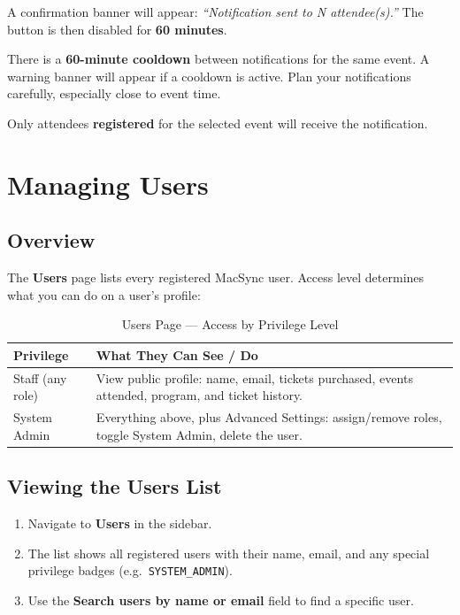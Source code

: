 \documentclass[12pt, twoside]{report}
\newcommand{\uielem}[1]{\textbf{#1}}
\begin{document}
A confirmation banner will appear: \textit{``Notification sent to N
attendee(s).''} The button is then disabled for \textbf{60 minutes}.

\begin{warnbox}
There is a \textbf{60-minute cooldown} between notifications for the same
event. A warning banner will appear if a cooldown is active. Plan your
notifications carefully, especially close to event time.
\end{warnbox}

\begin{tipbox}
Only attendees \textbf{registered} for the selected event will receive
the notification.
\end{tipbox}



\chapter{Managing Users}


\section{Overview}

The \uielem{Users} page lists every registered MacSync user. Access level
determines what you can do on a user's profile:

\begin{table}[H]
  \centering
  \caption{Users Page --- Access by Privilege Level}
  \begin{tabular}{@{} p{3.5cm} p{9cm} @{}}
    \toprule
    \textbf{Privilege} & \textbf{What They Can See / Do} \\
    \midrule
    Staff (any role)  & View public profile: name, email, tickets purchased,
                        events attended, program, and ticket history. \\
    System Admin      & Everything above, plus Advanced Settings: assign/remove
                        roles, toggle System Admin, delete the user. \\
    \bottomrule
  \end{tabular}
\end{table}

\section{Viewing the Users List}

\begin{enumerate}
  \item Navigate to \uielem{Users} in the sidebar.
  \item The list shows all registered users with their name, email, and
        any special privilege badges (e.g.\ \texttt{SYSTEM\_ADMIN}).
  \item Use the \uielem{Search users by name or email} field to find a
        specific user.
\end{enumerate}
\end{document}
